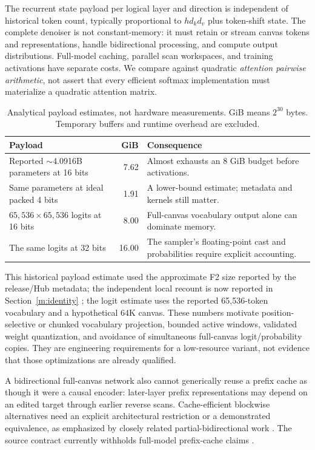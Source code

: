 \documentclass{article}
\theoremstyle{remark}\newtheorem{remark}[theorem]{Remark}
\begin{document}
The recurrent state payload per logical layer and direction is independent of historical token count, typically proportional to $h d_kd_v$ plus token-shift state. The complete denoiser is not constant-memory: it must retain or stream canvas tokens and representations, handle bidirectional processing, and compute output distributions. Full-model caching, parallel scan workspaces, and training activations have separate costs. We compare against quadratic \emph{attention pairwise arithmetic}, not assert that every efficient softmax implementation must materialize a quadratic attention matrix.

\begin{table}[ht]
\centering\small
\caption{Analytical payload estimates, not hardware measurements. GiB means $2^{30}$ bytes. Temporary buffers and runtime overhead are excluded.}
\begin{tabularx}{\linewidth}{@{}Y r Y@{}}
\toprule
Payload & GiB & Consequence \\
\midrule
Reported $\sim$4.0916B parameters at 16 bits & 7.62 & Almost exhausts an 8 GiB budget before activations. \\
Same parameters at ideal packed 4 bits & 1.91 & A lower-bound estimate; metadata and kernels still matter. \\
$65{,}536\times65{,}536$ logits at 16 bits & 8.00 & Full-canvas vocabulary output alone can dominate memory. \\
The same logits at 32 bits & 16.00 & The sampler's floating-point cast and probabilities require explicit accounting. \\
\bottomrule
\end{tabularx}
\label{tab:memory}
\end{table}

This historical payload estimate used the approximate F2 size reported by the release/Hub metadata; the independent local recount is now reported in Section~\ref{m:identity} \cite{f2release}; the logit estimate uses the reported 65,536-token vocabulary and a hypothetical 64K canvas. These numbers motivate position-selective or chunked vocabulary projection, bounded active windows, validated weight quantization, and avoidance of simultaneous full-canvas logit/probability copies. They are engineering requirements for a low-resource variant, not evidence that those optimizations are already qualified.

A bidirectional full-canvas network also cannot generically reuse a prefix cache as though it were a causal encoder: later-layer prefix representations may depend on an edited target through earlier reverse scans. Cache-efficient blockwise alternatives need an explicit architectural restriction or a demonstrated equivalence, as emphasized by closely related partial-bidirectional work \cite{partial}. The source contract currently withholds full-model prefix-cache claims \cite{repo}.
\end{document}
